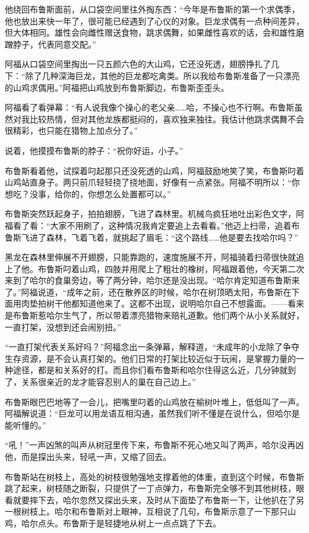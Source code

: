 \documentclass[../main.tex]{subfiles}
\begin{document}
他绕回布鲁斯面前，从口袋空间里往外掏东西：“今年是布鲁斯的第一个求偶季，他也放出来快一年了，很可能已经遇到了心仪的对象。巨龙求偶有一点种间差异，但大体相同。雄性会向雌性赠送食物，跳求偶舞，如果雌性喜欢的话，会和雄性磨蹭脖子，代表同意交配。”

阿福从口袋空间里掏出一只五颜六色的大山鸡，它还没死透，翅膀挣扎了几下：“除了几种深海巨龙，其他的巨龙都吃禽类。所以我给布鲁斯准备了一只漂亮的山鸡求偶用。”阿福把山鸡放到布鲁斯脚边，布鲁斯歪歪头。

阿福看了看弹幕：“有人说我像个操心的老父亲……哈，不操心也不行啊。布鲁斯虽然对我比较热情，但对其他龙族都挺闷的，喜欢独来独往。我估计他跳求偶舞不会很精彩，也只能在猎物上加点分了。”

说着，他摸摸布鲁斯的脖子：“祝你好运，小子。”

布鲁斯看着他，试探着叼起那只还没死透的山鸡，阿福鼓励地笑了笑，布鲁斯叼着山鸡站直身子。两只前爪轻轻挠了挠地面，好像有一点紧张。阿福不明所以：“你想吃？没事，给你的，你想怎么处置都可以。”

布鲁斯突然跃起身子，拍拍翅膀，飞进了森林里。机械鸟疯狂地吐出彩色文字，阿福看了看：“大家不用刷了，这种情况我肯定要追上去看看。”他迈上扫帚，追着布鲁斯飞进了森林，飞着飞着，就挑起了眉毛：“这个路线……他是要去找哈尔吗？”

黑龙在森林里伸展不开翅膀，只能靠跑的，速度施展不开，阿福骑着扫帚很快就追上了他。布鲁斯叼着山鸡，四肢并用爬上了粗壮的橡树，阿福跟着他，今天第二次来到了哈尔的食巢旁边，等了两分钟，哈尔还是没出现。“哈尔肯定知道布鲁斯来了。”阿福说道，“成年之前，还在散养区的时候，哈尔在树顶晒太阳，布鲁斯在下面用肉垫拍树干他都知道他来了。这都不出现，说明哈尔自己不想露面。——看来是布鲁斯惹哈尔生气了，所以带着漂亮猎物来赔礼道歉。他们两个从小关系就好，一直打架，没想到还会闹别扭。”

“一直打架代表关系好吗？”阿福念出一条弹幕，解释道，“未成年的小龙除了争夺生存资源，是不会认真打架的。他们日常的打架比较近似于玩闹，是掌握力量的一种途径，都是和关系好的打。而且你们看布鲁斯和哈尔住得这么近，几分钟就到了，关系很亲近的龙才能容忍别人的巢在自己边上。”

布鲁斯眼巴巴地等了一会儿，把嘴里叼着的山鸡放在榆树叶堆上，低低叫了一声。阿福解说道：“巨龙可以用龙语互相沟通，虽然我们听不懂是在说什么，但哈尔是能听懂的。”

“吼！”一声凶煞的叫声从树冠里传下来，布鲁斯不死心地又叫了两声，哈尔没再凶他，而是探出头来，轻吼一声，又缩了回去。

布鲁斯站在树枝上，高处的树枝很勉强地支撑着他的体重，直到这个时候，布鲁斯跳了起来，树枝随之断裂，只提供了一丁点弹力，布鲁斯完全够不到其他树枝，眼看就要摔下去，哈尔忽然又探出头来，及时从下面垫了布鲁斯一下，让他扒在了另一根树枝上。哈尔和布鲁斯对上眼神，互相说了几句，布鲁斯示意了一下那只山鸡，哈尔点头。布鲁斯于是轻捷地从树上一点点跳了下去。
\end{document}
